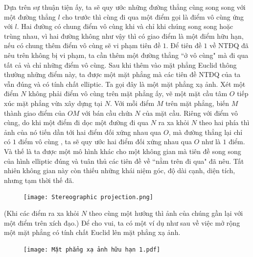 \begin{multicols}{2}
	\vskip 0.1cm
	Dựa trên sự thuận tiện ấy, ta sẽ quy ước những đường thẳng cùng song song với một đường thẳng $l$ cho trước thì cùng đi qua một điểm gọi là điểm vô cùng ứng với $l$. Hai đường có chung điểm vô cùng khi và chỉ khi chúng song song hoặc trùng nhau, vì hai đường không như vậy thì có giao điểm là một điểm hữu hạn, nếu có chung thêm điểm vô cùng sẽ vi phạm tiên đề $1$. Để tiên đề $1$ về NTĐQ đã nêu trên không bị vi phạm, ta cần thêm một đường thẳng ``ở vô cùng" mà đi qua tất cả và chỉ những điểm vô cùng. Sau khi thêm vào mặt phẳng Euclid thông thường những điểm này, ta được một mặt phẳng mà các tiên đề NTĐQ của ta vẫn đúng và có tính chất elliptic. Ta gọi đây là một mặt phẳng xạ ảnh.
	\vskip 0.1cm
	Xét một điểm $N$ không phải điểm vô cùng trên mặt phẳng ấy, vẽ một mặt cầu tâm $O$ tiếp xúc mặt phẳng vừa xây dựng tại $N$. Với mỗi điểm $M$ trên mặt phẳng, biến $M$ thành giao điểm của $OM$ với bán cầu chứa $N$ của mặt cầu. Riêng với điểm vô cùng, do khi một điểm đi dọc một đường đi qua $N$ ra xa khỏi $N$ theo hai phía thì ảnh của nó tiến dần tới hai điểm đối xứng nhau qua $O$, mà đường thẳng lại chỉ có $1$ điểm vô cùng , ta sẽ quy ước hai điểm đối xứng nhau qua $O$ như là $1$ điểm. Và thế là ta được một mô hình khác cho một không gian mà tiên đề song song của hình elliptic đúng và tuân thủ các tiên đề về ``nằm trên đi qua" đã nêu. Tất nhiên không gian này còn thiếu những khái niệm góc, độ dài cạnh, diện tích, nhưng tạm thời thế đã.
	\begin{figure}[H]
		\vspace*{-5pt}
		\centering
		\captionsetup{labelformat= empty, justification=centering}
		\texttt{[image: Stereographic projection.png]}
		\vspace*{-10pt}
	\end{figure}
	(Khi các điểm ra xa khỏi $N$ theo cùng một hướng thì ảnh của chúng gần lại với một điểm trên xích đạo.)
	\vskip 0.1cm
	Để cho vui, ta có một ví dụ như sau về việc mở rộng một mặt phẳng có tính chất Euclid lên mặt phẳng xạ ảnh.
	\begin{figure}[H]
		\vspace*{-5pt}
		\centering
		\captionsetup{labelformat= empty, justification=centering}
		\texttt{[image: Mặt phẳng xạ ảnh hữu hạn 1.pdf]}
		\vspace*{-15pt}
	\end{figure}

\end{multicols}
